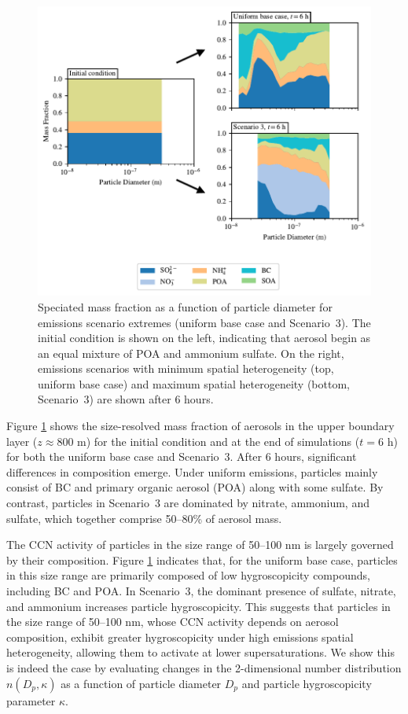 \documentclass[journal abbreviation, manuscript]{copernicus}
\begin{document}
\begin{figure}[!h]
	\centering
	\includegraphics[]{figures/speciated-mass-frac-three-panel-z40.pdf}
	\caption{Speciated mass fraction as a function of particle
          diameter for emissions scenario extremes (uniform base case
          and Scenario~3). The initial condition is shown on the left,
          indicating that aerosol begin as an equal mixture of POA and
          ammonium sulfate. On the right, emissions scenarios with
          minimum spatial heterogeneity (top, uniform base case) and
          maximum spatial heterogeneity (bottom, Scenario~3) are shown
          after 6 hours.}
	\label{fig:speciated-mass-frac}
\end{figure} 

Figure \ref{fig:speciated-mass-frac} shows the size-resolved mass
fraction of aerosols in the upper boundary layer ($z\approx 800$ m)
for the initial condition and at the end of simulations ($t=6$ h) for
both the uniform base case and Scenario~3. After 6 hours, significant
differences in composition emerge. Under uniform emissions, particles
mainly consist of BC and primary organic aerosol (POA) along with some
sulfate. By contrast, particles in Scenario~3 are dominated by
nitrate, ammonium, and sulfate, which together comprise 50--80\% of
aerosol mass.

The CCN activity of particles in the size range of 50--100 nm is
largely governed by their composition. Figure
\ref{fig:speciated-mass-frac} indicates that, for the uniform base
case, particles in this size range are primarily composed of low
hygroscopicity compounds, including BC and POA. In Scenario~3, the
dominant presence of sulfate, nitrate, and ammonium increases particle
hygroscopicity.  This suggests that particles in the size range of
50--100 nm, whose CCN activity depends on aerosol composition, exhibit
greater hygroscopicity under high emissions spatial heterogeneity,
allowing them to activate at lower
supersaturations. We show this is indeed the case
by evaluating changes in the 2-dimensional number distribution 
$n(D_p, \kappa)$ as a function of particle diameter $D_p$ and particle
hygroscopicity parameter $\kappa$.
\end{document}
